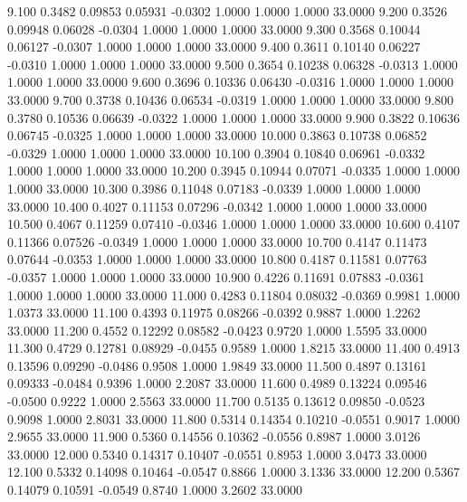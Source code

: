    9.100   0.3482   0.09853   0.05931  -0.0302   1.0000   1.0000   1.0000  33.0000
   9.200   0.3526   0.09948   0.06028  -0.0304   1.0000   1.0000   1.0000  33.0000
   9.300   0.3568   0.10044   0.06127  -0.0307   1.0000   1.0000   1.0000  33.0000
   9.400   0.3611   0.10140   0.06227  -0.0310   1.0000   1.0000   1.0000  33.0000
   9.500   0.3654   0.10238   0.06328  -0.0313   1.0000   1.0000   1.0000  33.0000
   9.600   0.3696   0.10336   0.06430  -0.0316   1.0000   1.0000   1.0000  33.0000
   9.700   0.3738   0.10436   0.06534  -0.0319   1.0000   1.0000   1.0000  33.0000
   9.800   0.3780   0.10536   0.06639  -0.0322   1.0000   1.0000   1.0000  33.0000
   9.900   0.3822   0.10636   0.06745  -0.0325   1.0000   1.0000   1.0000  33.0000
  10.000   0.3863   0.10738   0.06852  -0.0329   1.0000   1.0000   1.0000  33.0000
  10.100   0.3904   0.10840   0.06961  -0.0332   1.0000   1.0000   1.0000  33.0000
  10.200   0.3945   0.10944   0.07071  -0.0335   1.0000   1.0000   1.0000  33.0000
  10.300   0.3986   0.11048   0.07183  -0.0339   1.0000   1.0000   1.0000  33.0000
  10.400   0.4027   0.11153   0.07296  -0.0342   1.0000   1.0000   1.0000  33.0000
  10.500   0.4067   0.11259   0.07410  -0.0346   1.0000   1.0000   1.0000  33.0000
  10.600   0.4107   0.11366   0.07526  -0.0349   1.0000   1.0000   1.0000  33.0000
  10.700   0.4147   0.11473   0.07644  -0.0353   1.0000   1.0000   1.0000  33.0000
  10.800   0.4187   0.11581   0.07763  -0.0357   1.0000   1.0000   1.0000  33.0000
  10.900   0.4226   0.11691   0.07883  -0.0361   1.0000   1.0000   1.0000  33.0000
  11.000   0.4283   0.11804   0.08032  -0.0369   0.9981   1.0000   1.0373  33.0000
  11.100   0.4393   0.11975   0.08266  -0.0392   0.9887   1.0000   1.2262  33.0000
  11.200   0.4552   0.12292   0.08582  -0.0423   0.9720   1.0000   1.5595  33.0000
  11.300   0.4729   0.12781   0.08929  -0.0455   0.9589   1.0000   1.8215  33.0000
  11.400   0.4913   0.13596   0.09290  -0.0486   0.9508   1.0000   1.9849  33.0000
  11.500   0.4897   0.13161   0.09333  -0.0484   0.9396   1.0000   2.2087  33.0000
  11.600   0.4989   0.13224   0.09546  -0.0500   0.9222   1.0000   2.5563  33.0000
  11.700   0.5135   0.13612   0.09850  -0.0523   0.9098   1.0000   2.8031  33.0000
  11.800   0.5314   0.14354   0.10210  -0.0551   0.9017   1.0000   2.9655  33.0000
  11.900   0.5360   0.14556   0.10362  -0.0556   0.8987   1.0000   3.0126  33.0000
  12.000   0.5340   0.14317   0.10407  -0.0551   0.8953   1.0000   3.0473  33.0000
  12.100   0.5332   0.14098   0.10464  -0.0547   0.8866   1.0000   3.1336  33.0000
  12.200   0.5367   0.14079   0.10591  -0.0549   0.8740   1.0000   3.2602  33.0000
